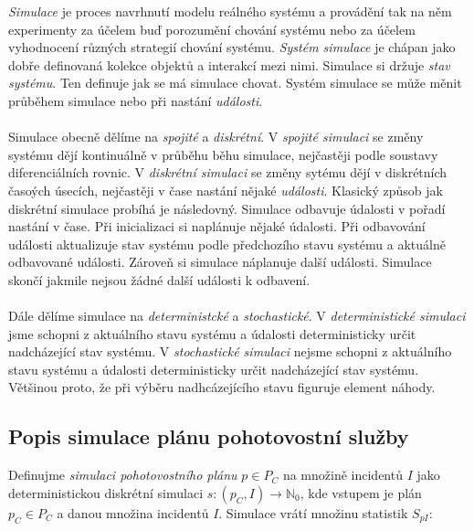 \textit{Simulace} je proces navrhnutí modelu reálného systému a provádění tak na něm experimenty za účelem buď porozumění chování systému
nebo za účelem vyhodnocení různých strategií chování systému.
\textit{Systém simulace} je chápan jako dobře definovaná kolekce objektů a interakcí mezi nimi.
Simulace si držuje \textit{stav systému}. Ten definuje jak se má simulace chovat.
Systém simulace se může měnit průběhem simulace nebo při nastání \textit{události}.
\\
\\
Simulace obecně dělíme na \textit{spojité} a \textit{diskrétní}.
V \textit{spojité simulaci} se změny systému dějí kontinuálně v průběhu běhu simulace, nejčastěji podle soustavy diferenciálních rovnic.
V \textit{diskrétní simulaci} se změny sytému dějí v diskrétních časoých úsecích, nejčastěji v čase nastání nějaké \textit{události}.
Klasický způsob jak diskrétní simulace probíhá je následovný.
Simulace odbavuje údalosti v pořadí nastání v čase.
Při inicializaci si naplánuje nějaké údalosti.
Při odbavování události aktualizuje stav systému podle předchozího stavu systému a aktuálně odbavované události. Zároveň si simulace náplanuje další události. 
Simulace skončí jakmile nejsou žádné další události k odbavení.
\\
\\
Dále dělíme simulace na \textit{deterministcké} a \textit{stochastické}.
V \textit{deterministické simulaci} jsme schopni z aktuálního stavu systému a údalosti deterministicky určit nadcházející stav systému.
V \textit{stochastické simulaci} nejsme schopni z aktuálního stavu systému a údalosti deterministicky určit nadcházející stav systému.
Většinou proto, že při výběru nadhcázejícího stavu figuruje element náhody.
\cite{SimulaceBook}

\subsection{Popis simulace plánu pohotovostní služby}\label{kap:definiceSimulace}

Definujme \textit{simulaci pohotovostního plánu} $p \in P_C$ na množině incidentů $I$ jako deterministickou diskrétní simulaci
$s \colon (p_C, I) \rightarrow \mathbb{N}_0$, kde vstupem je plán $p_C \in P_C$ a danou množina incidentů $I$.
Simulace vrátí množinu statistik $S_{pI}$:

